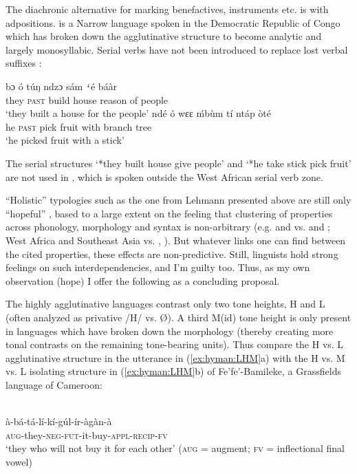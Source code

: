 \documentclass[output=paper]{langsci/langscibook}
\begin{document}
  

The diachronic alternative for marking benefactives, instruments etc. is with adpositions.  is a Narrow  language spoken in the Democratic Republic of Congo which has broken down the  agglutinative structure to become analytic and largely monosyllabic. Serial verbs have not been introduced to replace lost verbal suffixes \citep{Crane2011}: 

\ea
\ea
  \gll  bɔ    ó   túŋ   ndzɔ  sám %
  \texttt{ꜜ\hspace*{-.2em}}é  báàr  \\
    they \textsc{past} build  house reason of people \\
    \glt ‘they built a house for the people’  
\ex
    \gll ndé  ó  wɛɛ  \'{m}bùm  tí  ntáp  òté  \\
    he   \textsc{past}   pick    fruit   with branch tree\\
    \glt ‘he picked fruit with a stick’
\z
\z

The serial structures `*they built house give people' and `*he take stick pick fruit' are not used in , which is spoken outside the West African serial verb zone.

“Holistic” typologies such as the one from Lehmann presented above are still only “hopeful” \citep{Plank1998}, based to a large extent on the feeling that clustering of properties across phonology, morphology and syntax is non-arbitrary (e.g.  and  vs.  and ; West Africa and Southeast Asia vs. , ). But whatever links one can find between the cited properties, these effects are non-predictive. Still, linguists hold strong feelings on such interdependencies, and I’m guilty too. Thus, as my own observation (hope) I offer the following as a concluding proposal.

 The highly agglutinative  languages contrast only two tone heights, H and L (often analyzed as privative /H/ vs. Ø). A third M(id) tone height is only present in languages which have broken down the morphology (thereby creating more tonal contrasts on the remaining tone-bearing units). Thus compare the H vs. L agglutinative structure in the  utterance in (\ref{ex:hyman:LHM}a) with the H vs. M vs. L isolating structure in (\ref{ex:hyman:LHM}b) of Fe’fe’-Bamileke, a Grassfields  language of Cameroon:

\ea\label{ex:hyman:LHM}
  \ea  
  \\
  \gll à-bá-tá-lí-kí-gúl-ír-àgàn-à  \\
    \textsc{aug}{}-they-\textsc{neg-fut}{}-it-buy-\textsc{appl-recip-fv}  \\
    \glt ‘they who will not buy it for each other’
    (\textsc{aug} = augment; \textsc{fv} = inflectional final vowel)
\end{document}
